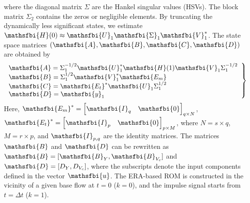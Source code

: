 \documentclass[standard]{jfm}
\begin{document}
where the diagonal matrix $\Sigma$ are the Hankel singular values (HSVs). 
The block matrix $\Sigma_2$ contains the zeros or 
negligible elements. By truncating the dynamically less significant states, we estimate 
$\mathsfbi{H}(0) \approx \mathsfbi{U}_1\mathsfbi{\Sigma}_1\mathsfbi{V}_1^*$. 
The state space matrices $(\mathsfbi{A}, \mathsfbi{B}, \mathsfbi{C}, \mathsfbi{D})$ are obtained by
\begin{equation}
\left. \begin{array}{ll}

\displaystyle \mathsfbi{A}=\Sigma^{-1/2}_{1}\mathsfbi{U}^{*}_{1}\mathsfbi{H}(1)\mathsfbi{V}_{1}\Sigma^{-1/2}_{1} \\
\displaystyle \mathsfbi{B}=\Sigma^{1/2}_{1}\mathsfbi{V}^{*}_{1}\mathsfbi{E_m}   \\
\displaystyle \mathsfbi{C}=\mathsfbi{E_t}^{*}\mathsfbi{U}_{1}\Sigma^{1/2}_{1}   \\    
\displaystyle \mathsfbi{D}=\mathsfbi{y}_{1}
\end{array}\right\}
 \label{eq:ERA_ROM_matrices}
\end{equation}  
Here, $\mathsfbi{E_m}^*=\left[\mathsfbi{I}_q \quad \mathsfbi{0} \right]_{q\times N}$, 
$\mathsfbi{E_t}^{*}=\left[\mathsfbi{I}_p \quad \mathsfbi{0} \right]_{p \times M}$, where
$N =s \times q$, $M =r \times p$, and $\mathsfbi{I}_{p,q}$ are the identity matrices. 
The matrices 
$\mathsfbi{B}$ and $\mathsfbi{D}$ can be rewritten as $\mathsfbi{B}=[\mathsfbi{B}_Y,\mathsfbi{B}_{V_c}]$ and  
$\mathsfbi{D}=[D_Y,D_{V_c}]$, where the subscripts denote the input components defined in the  vector $\mathsfbi{u}$. 
{\color{red} The ERA-based ROM is constructed in the vicinity of a given base flow at $t=0$ ($k=0$), 
and the impulse signal starts from $t= \Delta t$ ($k=1$).}
\end{document}
